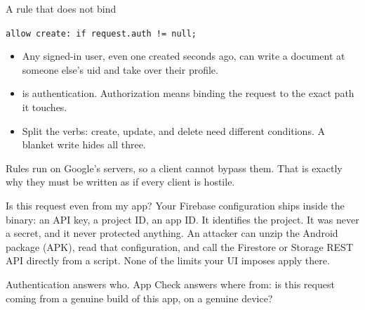 \documentclass[10pt,aspectratio=169,t]{beamer}
\begin{document}
\begin{frame}[eyebrow=Authorization]{A rule that does not bind}
  \vskip 1mm
  \begin{warning}
    \texttt{allow create: if request.auth != null;}
  \end{warning}
  \begin{itemize}
    \item Any signed-in user, even one created seconds ago, can write a document at someone else's uid and take over their profile.
    \item {} is authentication. Authorization means binding the request to the exact path it touches.
    \item Split the verbs: create, update, and delete need different conditions. A blanket write hides all three.
  \end{itemize}
  \begin{takeaway}{Rules run on Google's servers, so a client cannot bypass them.}
    That is exactly why they must be written as if every client is hostile.
  \end{takeaway}
\end{frame}

\begin{frame}[eyebrow=App Check]{Is this request even from my app?}
  \vskip 3mm
  Your Firebase configuration ships inside the binary: an API key, a project ID, an app ID. It identifies the project. It was never a secret, and it never protected anything.
  \vskip 3mm
  An attacker can unzip the Android package (APK), read that configuration, and call the Firestore or Storage REST API directly from a script. None of the limits your UI imposes apply there.
  \begin{takeaway}{Authentication answers who.}
    App Check answers where from: is this request coming from a genuine build of this app, on a genuine device?
  \end{takeaway}
\end{frame}
\end{document}
